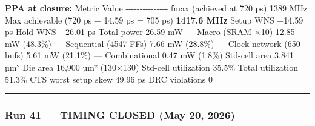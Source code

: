 \begin{record}
\textbf{PPA at closure:} \textbar{} Metric \textbar{} Value \textbar{}
\textbar-\/-\/-\/-\/-\/-\/-\/-\textbar-\/-\/-\/-\/-\/-\/-\textbar{}
\textbar{} fmax (achieved at 720 ps) \textbar{} 1389 MHz \textbar{}
\textbar{} Max achievable (720 ps − 14.59 ps = 705 ps) \textbar{}
\textbf{1417.6 MHz} \textbar{} \textbar{} Setup WNS \textbar{} +14.59 ps
\textbar{} \textbar{} Hold WNS \textbar{} +26.01 ps \textbar{}
\textbar{} Total power \textbar{} 26.59 mW \textbar{} \textbar{} ---
Macro (SRAM ×10) \textbar{} 12.85 mW (48.3\%) \textbar{} \textbar{} ---
Sequential (4547 FFs) \textbar{} 7.66 mW (28.8\%) \textbar{} \textbar{}
--- Clock network (650 bufs) \textbar{} 5.61 mW (21.1\%) \textbar{}
\textbar{} --- Combinational \textbar{} 0.47 mW (1.8\%) \textbar{}
\textbar{} Std-cell area \textbar{} 3,841 µm² \textbar{} \textbar{} Die
area \textbar{} 16,900 µm² (130×130) \textbar{} \textbar{} Std-cell
utilization \textbar{} 35.5\% \textbar{} \textbar{} Total utilization
\textbar{} 51.3\% \textbar{} \textbar{} CTS worst setup skew \textbar{}
49.96 ps \textbar{} \textbar{} DRC violations \textbar{} 0 \textbar{}

\begin{center}\rule{0.5\linewidth}{0.5pt}\end{center}

\end{record}

\subsubsection{\texorpdfstring{Run 41 --- TIMING CLOSED \ok{} (May 20,
2026) ---
}{Run 41 --- TIMING CLOSED  (May 20, 2026) --- }}\label{cr:run:asap7:run-41-timing-closed-white-check-mark-may-20-2026-run-2026-05-20-05-17-59}

